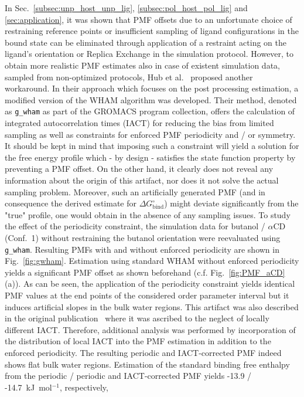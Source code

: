 \documentclass[9pt,lessons]{livecoms}
\begin{document}
In Sec.~\ref{subsec:unp_host_unp_lig},  \ref{subsec:pol_host_pol_lig}  and \ref{sec:application}, it was shown that PMF offsets due to an unfortunate choice of restraining reference points or insufficient sampling of ligand configurations in the bound state can be eliminated through application of a restraint acting on the ligand's orientation or Replica Exchange in the simulation protocol. 
However, to obtain more realistic PMF estimates also in case of existent simulation data, sampled from non-optimized protocols, Hub et al.~\cite{hub2010g_wham} proposed another workaround. 
In their approach which focuses on the post processing estimation, a modified version of the WHAM algorithm was developed.
Their method, denoted as \texttt{g\_wham} as part of the GROMACS program collection, offers the calculation of integrated autocorrelation times (IACT) for reducing the bias from limited sampling as well as constraints for enforced PMF periodicity and / or symmetry.
It should be kept in mind that imposing such a constraint will yield a solution for the free energy profile which - by design - satisfies the state function property by preventing a PMF offset. 
On the other hand, it clearly does not reveal any information about the origin of this artifact, nor does it not solve the actual sampling problem.
Moreover, such an artificially generated PMF (and in consequence the derived estimate for $\Delta G^\circ_\mathrm{bind}$) might deviate significantly from the "true" profile, one would obtain in the absence of any sampling issues. 
To study the effect of the periodicity constraint, the simulation data for butanol /  $\alpha$CD (Conf.~1) without restraining the butanol orientation were reevaluated using \texttt{g\_wham}.
Resulting PMFs with and without enforced periodicity are shown in Fig.~\ref{fig:gwham}. 
Estimation using standard WHAM  without enforced periodicity yields a significant PMF offset as shown beforehand (c.f. Fig.~\ref{fig:PMF_aCD} (a)).
As can be seen, the application of the periodicity constraint yields identical PMF values at the end points of the considered order parameter interval but it induces artificial slopes in the bulk water regions.
This artifact was also described in the original publication~\cite{hub2010g_wham} where it was ascribed to the neglect of locally different IACT.
Therefore, additional analysis was performed by incorporation of the distribution of local IACT into the PMF estimation in addition to the enforced periodicity.
The resulting periodic and IACT-corrected PMF indeed shows flat bulk water regions. 
Estimation of the standard binding free enthalpy from the periodic / periodic and IACT-corrected PMF yields -13.9 / -14.7~kJ~mol$^{-1}$, respectively, 
\end{document}
